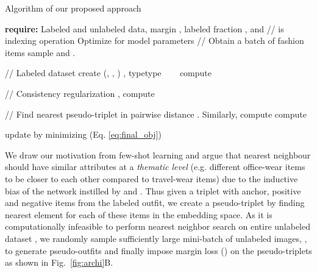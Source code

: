 \documentclass[sigconf]{acmart}
\newcommand{\algocomment}[1]{{\color{algoGray} #1}}
\begin{document}
\begin{algorithm}
\caption{Algorithm of our proposed approach}
\label{algo}
\begin{algorithmic}[1]
\small
\STATE \textbf{require:} Labeled  and unlabeled  data, margin , labeled fraction ,  and  \algocomment{//  is indexing operation} 
\STATE Optimize for model parameters  
\STATE {} 
	\STATE  \hspace{0.1in} \algocomment{{ // Obtain a batch of fashion items }}
      \STATE \hspace{0.1in} sample  and .
       
    \STATE \vspace{1mm} \hspace{0.1in} \algocomment{{// Labeled dataset }}
      \STATE \hspace{0.1in} create (, , ) ,  typetype ~~~ 
      \STATE \hspace{0.1in}  
      \STATE \hspace{0.1in} compute 

\STATE  \vspace{1.5mm} \hspace{0.1\in} \algocomment{{// Consistency regularization }}
\STATE \hspace{0.1in} ,   
\STATE \hspace{0.1in}  
\STATE \hspace{0.1in} compute 


\STATE \vspace{1.5mm}\hspace{0.1in} \algocomment{{// Find nearest pseudo-triplet in }}
\STATE \hspace{0.1in} pairwise distance . Similarly, compute  
\STATE \hspace{0.1in}  
\STATE \hspace{0.1in} compute 



\STATE \vspace{1.5mm} \hspace{0.1in}\algocomment{{// Minimize the final objective}}
\STATE \hspace{0.1in} update  by minimizing   (Eq. \ref{eq:final_obj})

\ENDFOR
\end{algorithmic}
\end{algorithm}


We draw our motivation from few-shot learning \cite{snell2017prototypical} and argue that nearest neighbour should have similar attributes at a \textit{thematic level} (e.g. different office-wear items to be closer to each other compared to travel-wear items) due to the inductive bias of the network instilled by  and .
Thus given a triplet with anchor, positive and negative items from the labeled outfit, we create a pseudo-triplet  by finding nearest element for each of these items in the embedding space. As it is computationally infeasible to perform nearest neighbor search on entire unlabeled dataset , we randomly sample sufficiently large mini-batch of unlabeled images, , to generate pseudo-outfits and finally impose margin loss () on the pseudo-triplets  as shown in Fig.~\ref{fig:archi}{B}.
\end{document}
